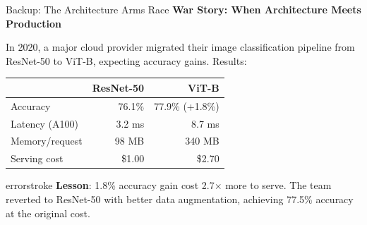 \documentclass[aspectratio=169, 12pt]{beamer}
\begin{document}
\begin{frame}{Backup: The Architecture Arms Race}
\footnotesize
\textbf{War Story: When Architecture Meets Production}

\vspace{0.1cm}
In 2020, a major cloud provider migrated their image classification pipeline from ResNet-50 to ViT-B, expecting accuracy gains. Results:

\vspace{0.05cm}
\scriptsize
\renewcommand{\arraystretch}{1.05}
\begin{tabular}{@{}lrr@{}}
  \toprule
  & \textbf{ResNet-50} & \textbf{ViT-B} \\
  \midrule
  Accuracy & 76.1\% & 77.9\% (+1.8\%) \\
  Latency (A100) & 3.2 ms & 8.7 ms \\
  Memory/request & 98 MB & 340 MB \\
  Serving cost & \$1.00 & \$2.70 \\
  \bottomrule
\end{tabular}

\vspace{0.05cm}
\footnotesize
\begin{mlsyscard}{errorstroke}
{\scriptsize \textbf{Lesson}: 1.8\% accuracy gain cost 2.7$\times$ more to serve. The team reverted to ResNet-50 with better data augmentation, achieving 77.5\% accuracy at the original cost.}
\end{mlsyscard}
\end{frame}
\end{document}
